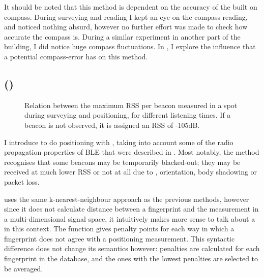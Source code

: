 It should be noted that this method is dependent on the accuracy of the built on compass.
During surveying and reading I kept an eye on the compass reading, and noticed nothing absurd, however no further effort was made to check how accurate the compass is.
During a similar experiment in another part of the building, I did notice huge compass fluctuations.
In , I explore the influence that a potential compass-error has on this method.

\subsection{\BRP (\aBRP)}
\label{sec:architecture-brp}
\begin{figure}[p]
    \begin{subfigure}[b]{0.5\textwidth}
    \end{subfigure}
    \begin{subfigure}[b]{0.5\textwidth}
    \end{subfigure}
    \begin{subfigure}[b]{0.5\textwidth}
    \end{subfigure}
    \begin{subfigure}[b]{0.5\textwidth}
    \end{subfigure}
    \caption{Relation between the maximum RSS per beacon measured in a spot during surveying and positioning, for different listening times. If a beacon is not observed, it is assigned an RSS of -105dB.}
    \label{fig:architecture-rss-cloud}
\end{figure}

I introduce \BRP to do positioning with \BLE, taking into account some of the radio propagation properties of BLE that were described in . 
Most notably, the method recognises that some beacons may be temporarily blacked-out; they may be received at much lower RSS or not at all due to \mpi, orientation, body shadowing or packet loss.

\aBRP uses the same k-nearest-neighbour approach as the previous methods, however since it does not calculate distance between a fingerprint and the measurement in a multi-dimensional signal space, it intuitively makes more sense to talk about a  in this context.
The function gives penalty points for each way in which a fingerprint does not agree with a positioning measurement.
This syntactic difference does not change its semantics however: penalties are calculated for each fingerprint in the database, and the ones with the lowest penalties are selected to be averaged.

